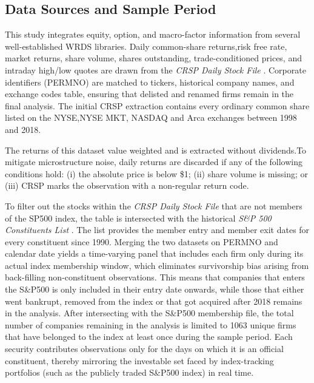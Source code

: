 






\subsection{Data Sources and Sample Period}\label{sec:data_sources}

This study integrates equity, option, and macro-factor information from several well-established WRDS libraries. Daily common-share returns,risk free rate, market returns, share volume, shares outstanding, trade-conditioned prices, and intraday high/low quotes are drawn from the \emph{CRSP Daily Stock File} \cite{crsp_dsf}. Corporate identifiers (PERMNO) are matched to tickers, historical company names, and exchange codes table, ensuring that delisted and renamed firms remain in the final analysis. The initial CRSP extraction contains every ordinary common share listed on the NYSE,NYSE MKT, NASDAQ and Arca exchanges between 1998 and 2018. 

The returns of this dataset value weighted and is extracted without dividends.To mitigate microstructure noise, daily returns are discarded if any of the following conditions hold: (i) the absolute price is below \$1; (ii) share volume is missing; or (iii) CRSP marks the observation with a non-regular return code.

To filter out the stocks within the \emph{CRSP Daily Stock File}  that are not members of the SP500 index, the table is intersected with the historical \emph{S\&P 500 Constituents List} \cite{compstat}. The list provides the member entry  and member exit dates for every constituent since 1990. Merging the two datasets on PERMNO and calendar date yields a time-varying panel that includes each firm only during its actual index membership window, which eliminates survivorship bias arising from back-filling non-constituent observations. This means that companies that enters the S\&P500 is only included in their entry date onwards, while those that either went bankrupt, removed from the index or that got acquired after 2018 remains in the analysis. After intersecting with the S\&P500 membership file, the total number of companies remaining in the analysis is limited to 1063 unique firms that have belonged to the index at least once during the sample period. Each security contributes observations only for the days on which it is an official constituent, thereby mirroring the investable set faced by index-tracking portfolios (such as the publicly traded S\&P500 index) in real time.

